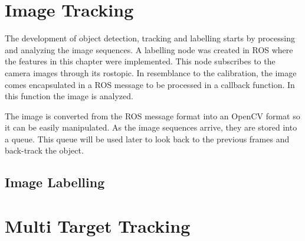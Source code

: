 \section{Image Tracking}

The development of object detection, tracking and labelling starts by processing and analyzing the image sequences. A labelling node was created in ROS where the features in this chapter were implemented. This node subscribes to the camera images through its rostopic. In resemblance to the calibration, the image comes encapsulated in a ROS message to be processed in a callback function. In this function the image is analyzed.

The image is converted from the ROS message format into an OpenCV format so it can be easily manipulated. As the image sequences arrive, they are stored into a queue. This queue will be used later to look back to the previous frames and back-track the object. 

\subsection{Image Labelling}

\section{Multi Target Tracking}